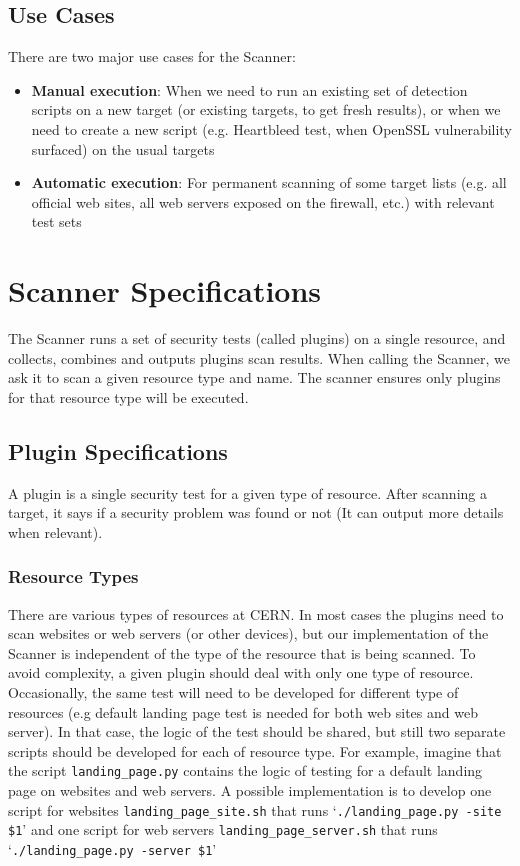 \subsection{Use Cases}
There are two major use cases for the Scanner:
\begin{itemize}
\item \textbf{Manual execution}: When we need to run an existing set of detection scripts on a new target (or existing targets, to get fresh results), or when we need to create a new script (e.g. Heartbleed test, when OpenSSL vulnerability surfaced) on the usual targets
\item \textbf{Automatic execution}: For permanent scanning of some target lists (e.g. all official web sites, all web servers exposed on the firewall, etc.) with relevant test sets
\end{itemize}

\section{Scanner Specifications}

The Scanner runs a set of security tests (called plugins) on a single resource, and collects, combines and outputs plugins scan results. When calling the Scanner, we ask it to scan a given resource type and name. The scanner ensures only plugins for that resource type will be executed. 

\subsection{Plugin Specifications}
A plugin is a single security test for a given type of resource. After scanning a target, it says if a security problem was found or not (It can output more details when relevant). 
\subsubsection{Resource Types}
There are various types of resources at CERN. In most cases the plugins need to scan websites or web servers (or other devices), but our implementation of the Scanner is independent of the type of the resource that is being scanned. To avoid complexity, a given plugin should deal with only one type of resource. Occasionally, the same test will need to be developed for different type of resources (e.g default landing page test is needed for both web sites and web server). In that case, the logic of the test should be shared, but still two separate scripts should be developed for each of resource type. For example, imagine that the script \texttt{landing\_page.py} contains the logic of testing for a default landing page on websites and web servers. A possible implementation is to develop one script for websites \texttt{landing\_page\_site.sh} that runs `\texttt{./landing\_page.py -site \$1}' and one script for web servers \texttt{landing\_page\_server.sh} that runs `\texttt{./landing\_page.py -server \$1}' 

